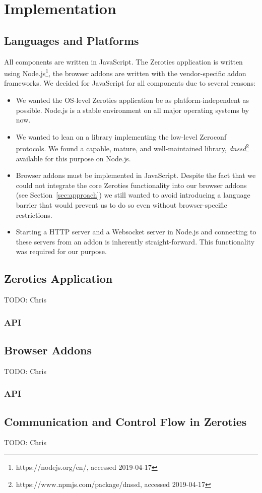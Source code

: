\section{Implementation}
\label{sec:implementation}

\subsection{Languages and Platforms}
\label{sub:languages_and_platforms}

All components are written in JavaScript. 
The Zeroties application is written using Node.js\footnote{https://nodejs.org/en/, accessed 2019-04-17}, the browser addons are written with the vendor-specific addon frameworks.
We decided for JavaScript for all components due to several reasons:
\begin{itemize}
\item We wanted the OS-level Zeroties application be as platform-independent as possible. 
Node.js is a stable environment on all major operating systems by now.
\item We wanted to lean on a library implementing the low-level Zeroconf protocols.
We found a capable, mature, and well-maintained library, \textit{dnssd}\footnote{https://www.npmjs.com/package/dnssd, accessed 2019-04-17} available for this purpose on Node.js.
\item Browser addons must be implemented in JavaScript.
Despite the fact that we could not integrate the core Zeroties functionality into our browser addons (see Section~\ref{sec:approach}) we still wanted to avoid  introducing a language barrier that would prevent us to do so even without browser-specific restrictions.
\item Starting a HTTP server and a Websocket server in Node.js and connecting to these servers from an addon is inherently straight-forward.
This functionality was required for our purpose.
\end{itemize}

\subsection{Zeroties Application}
\label{sub:zeroties_application}

TODO: Chris

\subsubsection{API}

\subsection{Browser Addons}
\label{sub:browser_addons}

TODO: Chris

\subsubsection{API}

\subsection{Communication and Control Flow in Zeroties}
\label{sub:communication}

TODO: Chris